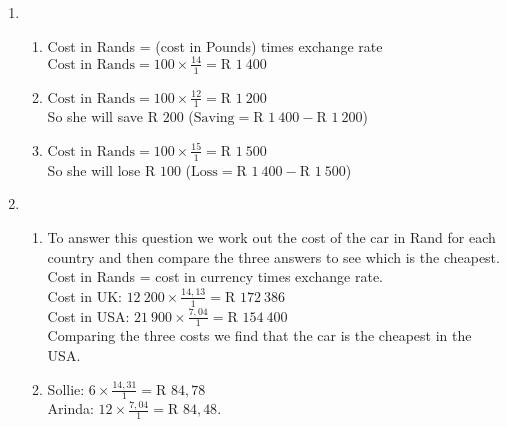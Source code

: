  \begin{solutions}{}{
\begin{enumerate}[itemsep=5pt, label=\textbf{\arabic*}. ] 


\item \begin{enumerate}[noitemsep, label=\textbf{(\alph*)} ]
\item Cost in Rands = (cost in Pounds) times exchange rate\\
$\mbox{Cost in Rands}=100 \times \frac{14}{1} = \mbox{R }1~400$
\item $\mbox{Cost in Rands}=100 \times \frac{12}{1} = \mbox{R }1~200$\\
So she will save $\mbox{R }200$ ($\mbox{Saving} = \mbox{R }1~400 - \mbox{R }1~200$)
\item $\mbox{Cost in Rands}=100 \times \frac{15}{1} = \mbox{R }1~500$ \\
So she will lose $\mbox{R }100$ ($\mbox{Loss} = \mbox{R }1~400 - \mbox{R }1~500$)
\end{enumerate}
\item \begin{enumerate}[noitemsep, label=\textbf{(\alph*)} ]
\item To answer this question we work out the cost of the car in Rand for each country and then compare the three answers to see which is the cheapest. Cost in Rands = cost in currency times exchange rate.\\
Cost in UK: $12~200 \times \frac{14,13}{1} = \mbox{R }172~386$\\
Cost in USA: $21~900 \times \frac{7,04}{1} = \mbox{R }154~400$\\
Comparing the three costs we find that the car is the cheapest in the USA.
\item Sollie: $6 \times \frac{14,31}{1} = \mbox{R }84,78$\\
Arinda: $12 \times \frac{7,04}{1} = \mbox{R }84,48$.
\end{enumerate}

\end{enumerate}}
\end{solutions}


